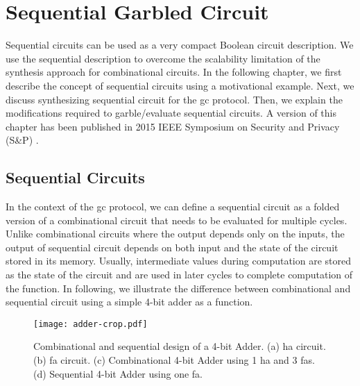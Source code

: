 \chapter{Sequential Garbled Circuit}\label{chap:seq}
Sequential circuits can be used as a very compact Boolean circuit description. We use the sequential description to overcome the scalability limitation of the synthesis approach for combinational circuits.
In the following chapter, we first describe the concept of sequential circuits using a motivational example.
Next, we discuss synthesizing sequential circuit for the \acrshort{gc} protocol.
Then, we explain the modifications required to garble/evaluate sequential circuits.
A version of this chapter has been published in 2015 IEEE Symposium on Security and Privacy (S\&P) \cite{songhori2015tinygarble}.

\section{Sequential Circuits}\label{sec:seq-seq}
In the context of the \acrshort{gc} protocol, we can define a sequential circuit as a folded version of a combinational circuit that needs to be evaluated for multiple cycles.
Unlike combinational circuits where the output depends only on the inputs, the output of sequential circuit depends on both input and the state of the circuit stored in its memory.
Usually, intermediate values during computation are stored as the state of the circuit and are used in later cycles to complete computation of the function.
In following, we illustrate the difference between combinational and sequential circuit using a simple 4-bit adder as a function.

\begin{figure}
    \centering
    \texttt{[image: adder-crop.pdf]}
    \caption{Combinational and sequential design of a 4-bit Adder.
  (a) \acrshort{ha} circuit.
  (b) \acrshort{fa} circuit.
  (c) Combinational 4-bit Adder using 1 \acrshort{ha} and 3 \acrshort{fa}s.
  (d) Sequential 4-bit Adder using one \acrshort{fa}.}\label{fig:combSeq}
\end{figure}

